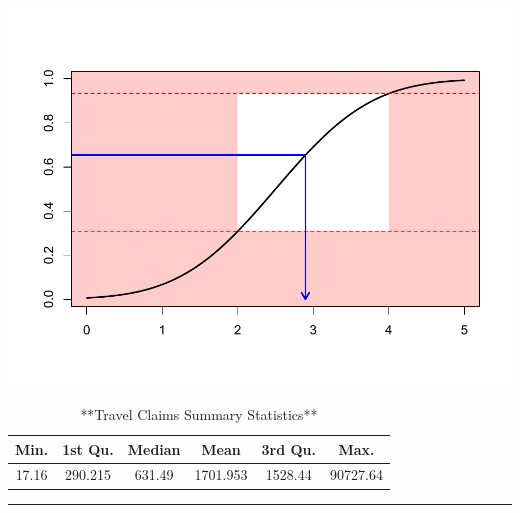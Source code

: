 \documentclass[
]{book}
\newenvironment{Shaded}{\begin{snugshade}}{\end{snugshade}}
\newcommand{\AttributeTok}[1]{\textcolor[rgb]{0.77,0.63,0.00}{#1}}
\newcommand{\CommentTok}[1]{\textcolor[rgb]{0.56,0.35,0.01}{\textit{#1}}}
\newcommand{\FunctionTok}[1]{\textcolor[rgb]{0.00,0.00,0.00}{#1}}
\newcommand{\NormalTok}[1]{#1}
\newcommand{\OtherTok}[1]{\textcolor[rgb]{0.56,0.35,0.01}{#1}}
\newcommand{\SpecialCharTok}[1]{\textcolor[rgb]{0.00,0.00,0.00}{#1}}
\newcommand{\StringTok}[1]{\textcolor[rgb]{0.31,0.60,0.02}{#1}}
\begin{document}
\begin{center}\includegraphics{LossDataAnalytics_files/figure-latex/unnamed-chunk-18-1} \end{center}

\begin{Shaded}
\end{Shaded}

\begin{table}

\caption{\label{tab:unnamed-chunk-18}**Travel Claims Summary Statistics**}
\centering
\begin{tabular}[t]{c|c|c|c|c|c}
\hline
Min. & 1st Qu. & Median & Mean & 3rd Qu. & Max.\\
\hline
17.16 & 290.215 & 631.49 & 1701.953 & 1528.44 & 90727.64\\
\hline
\end{tabular}
\end{table}

\begin{center}\rule{0.5\linewidth}{0.5pt}\end{center}
\end{document}
